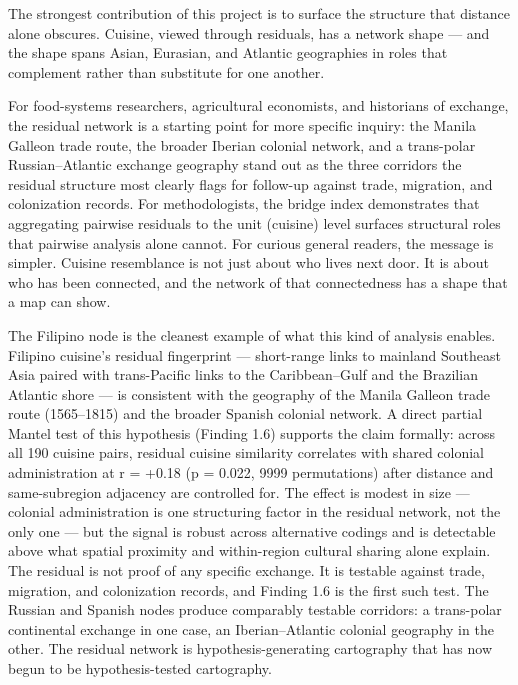 \documentclass[11pt]{article}
\begin{document}
The strongest contribution of this project is to surface the structure that distance alone obscures. Cuisine, viewed through residuals, has a network shape — and the shape spans Asian, Eurasian, and Atlantic geographies in roles that complement rather than substitute for one another.


For food-systems researchers, agricultural economists, and historians of exchange, the residual network is a starting point for more specific inquiry: the Manila Galleon trade route, the broader Iberian colonial network, and a trans-polar Russian–Atlantic exchange geography stand out as the three corridors the residual structure most clearly flags for follow-up against trade, migration, and colonization records. For methodologists, the bridge index demonstrates that aggregating pairwise residuals to the unit (cuisine) level surfaces structural roles that pairwise analysis alone cannot. For curious general readers, the message is simpler. Cuisine resemblance is not just about who lives next door. It is about who has been connected, and the network of that connectedness has a shape that a map can show.


The Filipino node is the cleanest example of what this kind of analysis enables. Filipino cuisine's residual fingerprint — short-range links to mainland Southeast Asia paired with trans-Pacific links to the Caribbean–Gulf and the Brazilian Atlantic shore — is consistent with the geography of the Manila Galleon trade route (1565–1815) and the broader Spanish colonial network. A direct partial Mantel test of this hypothesis (Finding 1.6) supports the claim formally: across all 190 cuisine pairs, residual cuisine similarity correlates with shared colonial administration at r = +0.18 (p = 0.022, 9999 permutations) after distance and same-subregion adjacency are controlled for. The effect is modest in size — colonial administration is one structuring factor in the residual network, not the only one — but the signal is robust across alternative codings and is detectable above what spatial proximity and within-region cultural sharing alone explain. The residual is not proof of any specific exchange. It is testable against trade, migration, and colonization records, and Finding 1.6 is the first such test. The Russian and Spanish nodes produce comparably testable corridors: a trans-polar continental exchange in one case, an Iberian–Atlantic colonial geography in the other. The residual network is hypothesis-generating cartography that has now begun to be hypothesis-tested cartography.
\end{document}
